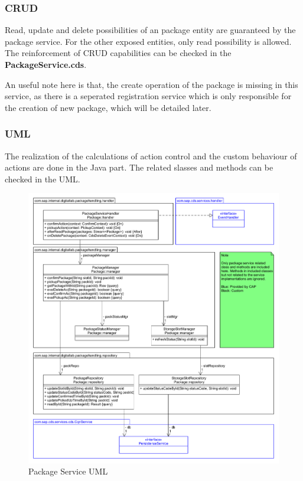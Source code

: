 \subsubsection{CRUD}
Read, update and delete possibilities of an package entity are guaranteed by the package service. For the other exposed entities, only read possibility is allowed. The reinforcement of CRUD capabilities can be checked in the \textbf{PackageService.cds}. 

\bigskip
An useful note here is that, the create operation of the package is missing in this service, as there is a seperated registration service which is only responsible for the creation of new package, which will be detailed later.

\subsubsection{UML}

The realization of the calculations of action control and the custom behaviour of actions are done in the Java part. The related slasses and methods can be checked in the UML. 

\begin{figure}[!h]
    \centering
    \includegraphics[width=1\linewidth]{images/service_class_diagrams/package_service_class_diagram.png}
    \caption{Package Service UML}
    \label{fig:package_service_uml}
\end{figure}
\pagebreak



